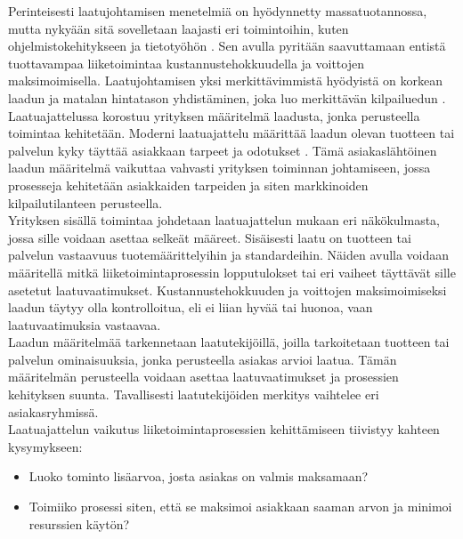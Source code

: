\documentclass[finnish,12pt,a4paper,pdftex]{article}
\begin{document}
Perinteisesti laatujohtamisen menetelmiä on hyödynnetty massatuotannossa, mutta nykyään sitä sovelletaan laajasti eri toimintoihin, kuten ohjelmistokehitykseen ja tietotyöhön \citep{ohjelmistotuotanto}. Sen avulla pyritään saavuttamaan entistä tuottavampaa liiketoimintaa kustannustehokkuudella ja voittojen maksimoimisella. Laatujohtamisen yksi merkittävimmistä hyödyistä on korkean laadun ja matalan hintatason yhdistäminen, joka luo merkittävän kilpailuedun \citep{teollisuustalous}.\\

Laatuajattelussa korostuu yrityksen määritelmä laadusta, jonka perusteella toimintaa kehitetään. Moderni laatuajattelu määrittää laadun olevan tuotteen tai palvelun kyky täyttää asiakkaan tarpeet ja odotukset \citep{teollisuustalous}. Tämä asiakaslähtöinen laadun määritelmä vaikuttaa vahvasti yrityksen toiminnan johtamiseen, jossa prosesseja kehitetään asiakkaiden tarpeiden ja siten markkinoiden kilpailutilanteen perusteella. \\

Yrityksen sisällä toimintaa johdetaan laatuajattelun mukaan eri näkökulmasta, jossa sille voidaan asettaa selkeät määreet. Sisäisesti laatu on tuotteen tai palvelun vastaavuus tuotemäärittelyihin ja standardeihin. Näiden avulla voidaan määritellä mitkä liiketoimintaprosessin lopputulokset tai eri vaiheet täyttävät sille asetetut laatuvaatimukset. Kustannustehokkuuden ja voittojen maksimoimiseksi laadun täytyy olla kontrolloitua, eli ei liian hyvää tai huonoa, vaan laatuvaatimuksia vastaavaa. \citep{teollisuustalous}\\

Laadun määritelmää tarkennetaan laatutekijöillä, joilla tarkoitetaan tuotteen tai palvelun ominaisuuksia, jonka perusteella asiakas arvioi laatua. Tämän määritelmän perusteella voidaan asettaa laatuvaatimukset ja prosessien kehityksen suunta. Tavallisesti laatutekijöiden merkitys vaihtelee eri asiakasryhmissä. \citep{teollisuustalous}\\

Laatuajattelun vaikutus liiketoimintaprosessien kehittämiseen tiivistyy kahteen kysymykseen:
\begin{itemize}
\setlength{\itemsep}{0pt}
    \item Luoko tominto lisäarvoa, josta asiakas on valmis maksamaan?
    \item Toimiiko prosessi siten, että se maksimoi asiakkaan saaman arvon ja minimoi resurssien käytön?
\end{itemize}
\end{document}
